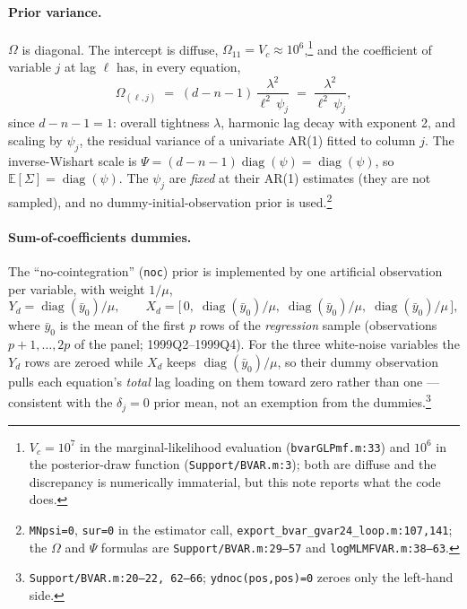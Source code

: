 \documentclass[11pt]{article}
\newcommand{\code}[1]{\texttt{\small #1}}
\begin{document}
\paragraph{Prior variance.} $\Omega$ is diagonal. The intercept is diffuse,
$\Omega_{11} = V_c \approx 10^{6}$,\footnote{$V_c = 10^{7}$ in the marginal-likelihood evaluation
(\code{bvarGLPmf.m:33}) and $10^{6}$ in the posterior-draw function (\code{Support/BVAR.m:3});
both are diffuse and the discrepancy is numerically immaterial, but this note reports what the
code does.} and the coefficient of variable $j$ at lag $\ell$ has, in every equation,
\begin{equation}\label{eq:minnesota}
  \Omega_{(\ell,j)} \;=\; (d-n-1)\, \frac{\lambda^2}{\ell^{2}\,\psi_j}
  \;=\; \frac{\lambda^{2}}{\ell^{2}\,\psi_j},
\end{equation}
since $d-n-1 = 1$: overall tightness $\lambda$, harmonic lag decay with exponent 2, and scaling by
$\psi_j$, the residual variance of a univariate AR(1) fitted to column $j$. The inverse-Wishart
scale is $\Psi = (d-n-1)\operatorname{diag}(\psi) = \operatorname{diag}(\psi)$, so
$\mathbb{E}[\Sigma] = \operatorname{diag}(\psi)$. The $\psi_j$ are \emph{fixed} at their AR(1)
estimates (they are not sampled), and no dummy-initial-observation prior is
used.\footnote{\code{MNpsi=0}, \code{sur=0} in the estimator call,
\code{export\_bvar\_gvar24\_loop.m:107,141}; the $\Omega$ and $\Psi$ formulas are
\code{Support/BVAR.m:29--57} and \code{logMLMFVAR.m:38--63}.}

\paragraph{Sum-of-coefficients dummies.} The ``no-cointegration'' (\code{noc}) prior is
implemented by one artificial observation per variable, with weight $1/\mu$,
\[
  Y_d = \operatorname{diag}(\bar y_0)/\mu, \qquad
  X_d = \big[\,0,\; \operatorname{diag}(\bar y_0)/\mu,\;
              \operatorname{diag}(\bar y_0)/\mu,\; \operatorname{diag}(\bar y_0)/\mu\,\big],
\]
where $\bar y_0$ is the mean of the first $p$ rows of the \emph{regression} sample (observations
$p{+}1, \dots, 2p$ of the panel; 1999Q2--1999Q4). For the three white-noise variables the $Y_d$
rows are zeroed while $X_d$ keeps $\operatorname{diag}(\bar y_0)/\mu$, so their dummy observation
pulls each equation's \emph{total} lag loading on them toward zero rather than one --- consistent
with the $\delta_j = 0$ prior mean, not an exemption from the
dummies.\footnote{\code{Support/BVAR.m:20--22, 62--66}; \code{ydnoc(pos,pos)=0} zeroes only the
left-hand side.}
\end{document}
